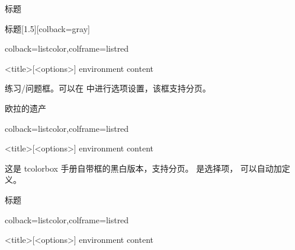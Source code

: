 \documentclass[fontset=none]{ctexart}
\begin{document}
	\begin{dispExample}
		\begin{simplesquarebox}[子标题]{标题}
			\zhlipsum[1]
		\end{simplesquarebox}
	\end{dispExample}
	
	\begin{dispExample}
		\begin{simplesquarebox}[子标题]{标题}[1.5][colback=gray]
			\zhlipsum[1]
		\end{simplesquarebox}
	\end{dispExample}
	
	\begin{dispListing*}{colback=listcolor,colframe=listred}
		\begin{practicebox}{<title>}[<options>]
			environment content
		\end{practicebox}
	\end{dispListing*}
	
	练习/问题框。可以在  中进行选项设置，该框支持分页。
	\begin{dispExample}
		\begin{practicebox}{欧拉的遗产}
			\zhlipsum[1]
		\end{practicebox}
	\end{dispExample}
	
	
	\begin{dispListing*}{colback=listcolor,colframe=listred}
		\begin{ascolorbox1}[<subtitle>]{<title>}[<options>]
			environment content
		\end{ascolorbox1}
	\end{dispListing*}
	
	这是 tcolorbox 手册自带框的黑白版本，支持分页。  是选择项，  可以自动加定义。
	
	\begin{dispExample}
		\begin{ascolorbox1}[子标题]{标题}
			\zhlipsum[1]
		\end{ascolorbox1}
	\end{dispExample}
	
	
	
	\begin{dispListing*}{colback=listcolor,colframe=listred}
		\begin{ascolorbox2}{<title>}[<options>]
			environment content
		\end{ascolorbox2}
	\end{dispListing*}
	
\end{document}
